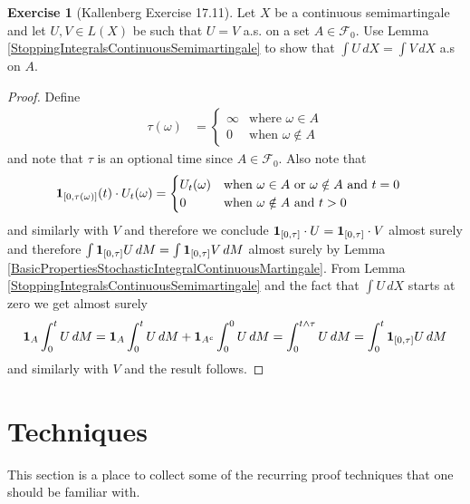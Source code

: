 \documentclass{amsart}
\theoremstyle{remark}
\theoremstyle{definition}
\newtheorem{ex}[thm]{Exercise}
\begin{document}
\begin{ex}[Kallenberg Exercise 17.11]Let $X$ be a continuous
  semimartingale and let $U,V \in L(X)$ be such that $U = V$ a.s. on a
  set $A \in \mathcal{F}_0$.  Use Lemma
  \ref{StoppingIntegralsContinuousSemimartingale} to show that $\int U \, dX = \int V \, dX$
  a.s on $A$.
\end{ex}
\begin{proof}
Define 
\begin{align*}
\tau(\omega) &= \begin{cases}
\infty & \text{where $\omega \in A$} \\
0 & \text{when $\omega \notin A$}
\end{cases}
\end{align*}
and note that $\tau$ is an optional time since $A \in
\mathcal{F}_0$. Also note that 
\begin{align*}
\textbf{1}_{[0,\tau(\omega)]}( t)
\cdot U_t(\omega)  &= \begin{cases}
U_t(\omega) & \text{when $\omega \in A$ or $\omega \notin A$ and
  $t=0$} \\
0 & \text{when $\omega \notin A$ and $t > 0$}
\end{cases}
\end{align*}
and similarly with $V$ and therefore we conclude
$\textbf{1}_{[0,\tau]} \cdot U = \textbf{1}_{[0,\tau]} \cdot
V$ almost surely and therefore $\int \textbf{1}_{[0,\tau]}  U \,
dM = \int \textbf{1}_{[0,\tau]}  V \, dM$ almost surely by Lemma
\ref{BasicPropertiesStochasticIntegralContinuousMartingale}.   From Lemma
\ref{StoppingIntegralsContinuousSemimartingale} and the fact that
$\int U \, dX$ starts at zero we get almost surely
\begin{align*}
\textbf{1}_{A} \int_0^t U \, dM &= \textbf{1}_{A} \int_0^t U
\, dM + \textbf{1}_{A^c} \int_0^0 U \, dM 
=\int_0^{t \wedge \tau} U \, dM 
= \int_0^{t} \textbf{1}_{[0,\tau]} U \, dM \\
\end{align*}
and similarly with $V$ and the result follows.
\end{proof}

\section{Techniques}

This section is a place to collect some of the recurring proof
techniques that one should be familiar with.
\end{document}
